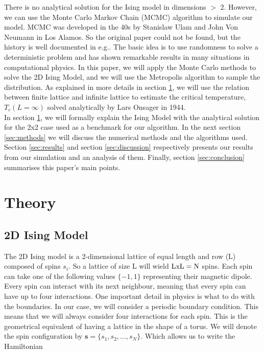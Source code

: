 \documentclass[english,notitlepage,reprint,nofootinbib]{revtex4-2}  %
\begin{document}
	There is no analytical solution for the Ising model in dimensions $>$ 2.
However, we can use the Monte Carlo Markov Chain (MCMC) algorithm to simulate
our model.
	MCMC was developed in the 40s by Stanislaw Ulam and John Von Neumann in Los
Alamos. So the original paper could not be found, but the history is well
documented in e.g.\cite{Robert_2011}. The basic idea is to use randomness to
solve a deterministic problem and has shown remarkable
	results in many situations in computational
physics. In this
	paper, we will apply the Monte Carlo methods to solve the 2D Ising Model, and
we will use the
	Metropolis algorithm to sample the distribution. As explained in more
details in section
	\ref{sec:theory}, we will use the relation between finite lattice and
infinite lattice to
	estimate the critical temperature, $T_c(L=\infty)$ solved analytically by
Lars Onsager in 1944. \\

	In section \ref{sec:theory}, we will formally explain the Ising Model
	with the analytical solution for the 2x2 case used as a benchmark for our algorithm. In the
	next section \ref{sec:methods} we will discuss the numerical methods and the algorithms
	used. Section \ref{sec:results} and section \ref{sec:discussion} respectively presents our
	results from our simulation and an analysis of them. Finally, section \ref{sec:conclusion} summarises this paper's main points.
	\section{Theory}\label{sec:theory}
\subsection{2D Ising Model} \label{subsec:Ising}
	The 2D Ising model is a 2-dimensional lattice of equal length and row (L) composed of spins
	$s_i$. So a lattice of size L will wield $\rm LxL=N$ spins. Each spin can take one of the
	following values $\{-1,	1\}$ representing their magnetic dipole. Every spin can interact
	with its next neighbour, meaning that every spin can have up to four interactions. One
	important detail in physics is what to do with the boundaries. In our case, we will consider
	a periodic boundary condition. This means that we will always consider four interactions
	for each spin. This is the geometrical equivalent of having a lattice in the shape of a
	torus. We will denote the spin configuration by $\textbf{s}=\{s_1, s_2, ..., s_N\}$. Which allows us
	to write the Hamiltonian
\end{document}
